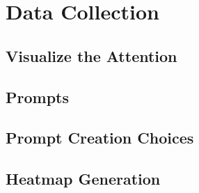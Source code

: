 \chapter{Data Collection}
\label{cha:data_collection}

\section{Visualize the Attention}
\label{sec:visualize_the_attention}

\section{Prompts}
\label{sec:prompts}

\section{Prompt Creation Choices}
\label{sec:prompt_creation_choices}

\section{Heatmap Generation}
\label{sec:heatmap_generation}

